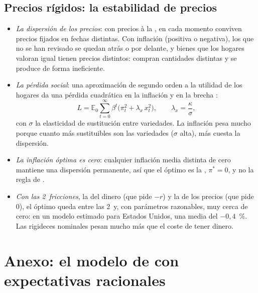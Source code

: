 \documentclass[11pt]{article}
\begin{document}
\subsection{Precios rígidos: la estabilidad de precios}\label{anexo:optima-rigideces}

\begin{itemize}
\item \emph{La dispersión de los precios}: con precios à la , en cada momento conviven precios fijados en fechas distintas. Con inflación (positiva o negativa), los que no se han revisado se quedan atrás o por delante, y bienes que los hogares valoran igual tienen precios distintos: compran cantidades distintas y se produce de forma ineficiente.
\item \emph{La pérdida social}: una aproximación de segundo orden a la utilidad de los hogares da una pérdida cuadrática en la inflación y en la brecha\nocite{Woodford2003Interest,Gali2015Monetary} :
  \begin{equation*}
  L=\mathbb{E}_0\sum_{t=0}^{\infty}\beta^t\big(\pi_t^2+\lambda_x\,x_t^2\big),\qquad\lambda_x=\frac{\kappa}{\sigma},
  \end{equation*}
  con $\sigma$ la elasticidad de sustitución entre variedades. La inflación pesa mucho porque cuanto más sustituibles son las variedades ($\sigma$ alta), más cuesta la dispersión.
\item \emph{La inflación óptima es cero}: cualquier inflación media distinta de cero mantiene una dispersión permanente, así que el óptimo es la , $\pi^*=0$, y no la regla de .
\item \emph{Con las 2~fricciones}, la del dinero (que pide $-r$) y la de los precios (que pide 0), el óptimo queda entre las 2~y, con parámetros razonables, muy cerca de cero: en un modelo estimado para Estados Unidos, una media del $-0{,}4$~\%\nocite{SchmittGroheUribe2010Optimal}. Las rigideces nominales pesan mucho más que el coste de tener dinero.\findemo
\end{itemize}

\section{Anexo: el modelo de  con expectativas racionales}\label{anexo:cagan-racionales}
\end{document}
